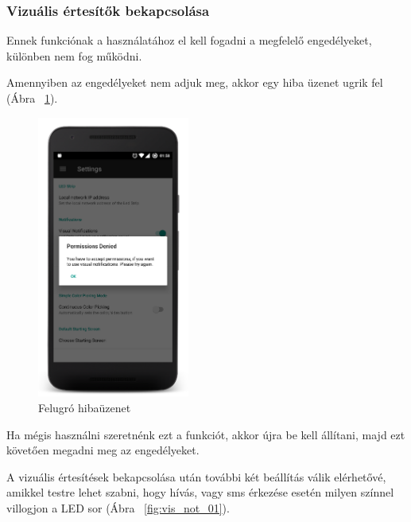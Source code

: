 \documentclass[../main.tex]{subfiles}
\begin{document}
            \subsubsection{Vizuális értesítők bekapcsolása}
                Ennek funkciónak a használatához el kell fogadni a megfelelő engedélyeket, különben nem fog működni.
                
                Amennyiben az engedélyeket nem adjuk meg, akkor egy hiba üzenet ugrik fel (Ábra ~\ref{fig:permission_denied}).
                \begin{figure}[h!]
                    \centering
                    \includegraphics[width=5cm]{android_res/screen_pictures/visual_notification_02.png}
                    \caption{Felugró hibaüzenet}
                    \label{fig:permission_denied}
                \end{figure}
                Ha mégis használni szeretnénk ezt a funkciót, akkor újra be kell állítani, majd ezt követően megadni meg az engedélyeket.
                
                A vizuális értesítések bekapcsolása után további két beállítás válik elérhetővé, amikkel testre lehet szabni, hogy hívás, vagy sms érkezése esetén milyen színnel villogjon a LED sor (Ábra ~\ref{fig:vis_not_01}).
                
\end{document}
